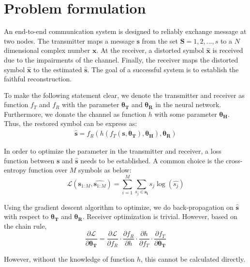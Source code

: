 \documentclass[12pt,a4paper]{article}
\begin{document}
	\section{Problem formulation}
	\noindent
	\par  An end-to-end communication system is designed to reliably exchange message at two nodes. The transmitter maps a message $\bm{s}$ from the set $\mathbf{S}={1,2,...,s}$ to a $N$ dimensional complex number $\bm{x}$. At the receiver, a distorted symbol $\hat{\bm{x}}$ is received due to the impairments of the channel. Finally, the receiver maps the distorted symbol $\hat{\bm{x}}$ to the estimated $\hat{\bm{s}}$. The goal of a successful system is to establish the faithful reconstruction.
	\par To make the following statement clear, we denote the transmitter and receiver as function $f_T$ and $f_R$ with the parameter $\bm{\theta_T}$ and $\bm{\theta_R}$ in the neural network. Furthermore, we donate the channel as function $h$ with some parameter $\bm{\theta_H}$. Thus, the restored symbol can be express as:
	\begin{equation}
		\begin{aligned}
			\hat{\bm{s}}=f_R(h(f_T(\bm{s},\bm{\theta_T}),\bm{\theta_H}),\bm{\theta_R})
		\end{aligned}
	\end{equation}
	\par In order to optimize the parameter in the transmitter and receiver, a loss function between $\bm{s}$ and $\hat{\bm{s}}$ needs to be established. A common choice is the cross-entropy function over $M$ symbols as below:
	\begin{equation} \label{loss}
		\mathcal{L}(\bm{s}_{1:M},\hat{\bm{s}_{1:M}})=\sum_{i=1}^{M}\sum_{s_j\in\bm{s_i}}s_j\log(\hat{s_j})
	\end{equation}
	\par Using the gradient descent algorithm to optimize, we do back-propagation on $\hat{\bm{s}}$ with respect to $\bm{\theta_T}$ and $\bm{\theta_R}$. Receiver optimization is trivial. However, based on the chain rule,
	\begin{equation}
		\frac{\partial\mathcal{L}}{\partial\bm{\theta_T}}=\frac{\partial\mathcal{L}}{\partial f_R}\cdot\frac{\partial f_R}{\partial h}\cdot\frac{\partial h}{\partial f_T}\cdot\frac{\partial f_T}{\partial\bm{\theta_T}}
	\end{equation}
	\par However, without the knowledge of function $h$, this cannot be calculated directly.
\end{document}
